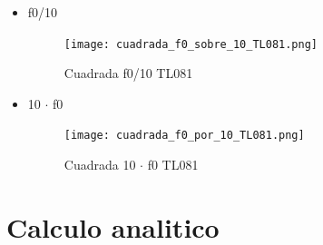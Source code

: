 \documentclass[11pt]{diazessay} %
\begin{document}
\begin{itemize}
\begin{itemize}
\newpage
\item f0/10
\begin{figure}[h]
\centering
	\texttt{[image: cuadrada\_f0\_sobre\_10\_TL081.png]}
\caption{Cuadrada f0/10 TL081}
\end{figure}

\newpage
\item 10 $\cdot$ f0
\begin{figure}[h]
\centering
	\texttt{[image: cuadrada\_f0\_por\_10\_TL081.png]}
\caption{Cuadrada 10 $\cdot$ f0 TL081}
\end{figure}

\end{itemize}

\end{itemize}

\newpage
\section*{Calculo analitico}
\end{document}
